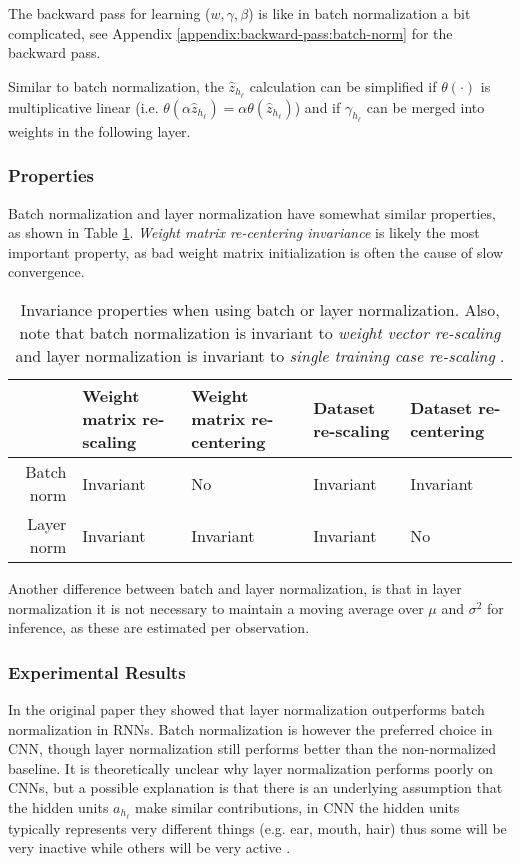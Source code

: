The backward pass for learning ($w, \gamma, \beta$) is like in batch normalization a bit complicated, see Appendix \ref{appendix:backward-pass:batch-norm} for the backward pass.

Similar to batch normalization, the $\hat{z}_{h_\ell}$ calculation can be simplified if $\theta(\cdot)$ is multiplicative linear (i.e. $\theta(\alpha \hat{z}_{h_\ell}) = \alpha \theta(\hat{z}_{h_\ell})$) and if $\gamma_{h_\ell}$ can be merged into weights in the following layer.

\subsubsection{Properties}

Batch normalization and layer normalization have somewhat similar properties, as shown in Table \ref{table:convergence:layer-norm:properties}. \textit{Weight matrix re-centering invariance} is likely the most important property, as bad weight matrix initialization is often the cause of slow convergence. 

\begin{table}[H]
\centering
\begin{tabular}{r|p{2cm} p{2cm} p{2cm} p{2cm}}
	           & Weight matrix re-scaling & Weight matrix re-centering & Dataset re-scaling& Dataset re-centering \\ \hline
	Batch norm & Invariant & No & Invariant & Invariant \\
	Layer norm & Invariant & Invariant & Invariant & No \\
\end{tabular}
\caption{Invariance properties when using batch or layer normalization. Also, note that batch normalization is invariant to \textit{weight vector re-scaling} and layer normalization is invariant to \textit{single training case re-scaling} \cite{layer-normalization}.}
\label{table:convergence:layer-norm:properties}
\end{table}

Another difference between batch and layer normalization, is that in layer normalization it is not necessary to maintain a moving average over $\mu$ and $\sigma^2$ for inference, as these are estimated per observation.

\subsubsection{Experimental Results}

In the original paper \cite{layer-normalization} they showed that layer normalization outperforms batch normalization in RNNs. Batch normalization is however the preferred choice in CNN, though layer normalization still performs better than the non-normalized baseline. It is theoretically unclear why layer normalization performs poorly on CNNs, but a possible explanation is that there is an underlying assumption that the hidden units $a_{h_\ell}$ make similar contributions, in CNN the hidden units typically represents very different things (e.g. ear, mouth, hair) thus some will be very inactive while others will be very active \cite{layer-normalization}.

